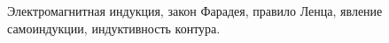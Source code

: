 \documentclass[__main__.tex]{subfiles}
\begin{document}
Электромагнитная индукция, закон Фарадея, правило Ленца, явление самоиндукции, индуктивность контура.\\ 

\end{document}

